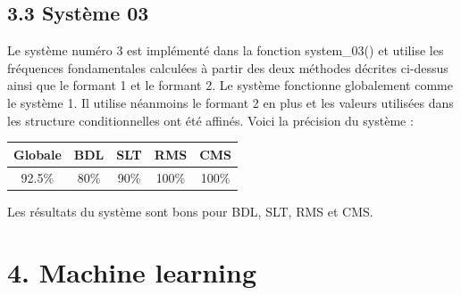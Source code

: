 \documentclass[a4paper,12pt]{report}	%
\begin{document}
{\subsection*{3.3 Système 03}}
Le système numéro 3 est implémenté dans la fonction system\_03() et utilise les fréquences fondamentales calculées à partir des deux méthodes décrites ci-dessus ainsi que le formant 1 et le formant 2. Le système fonctionne globalement comme le système 1. Il utilise néanmoins le formant 2 en plus et les valeurs utilisées dans les structure conditionnelles ont été affinés. Voici la précision du système : \\
\begin{center}
	\begin{tabular}{|c|c|c|c|c|}
		\hline
		Globale & BDL & SLT & RMS & CMS \\
		\hline
		92.5\% & 80\% & 90\% & 100\% & 100\% \\
		\hline
	\end{tabular}
\end{center}
Les résultats du système sont bons pour BDL, SLT, RMS et CMS.
{\section*{4. Machine learning}}
\end{document}

